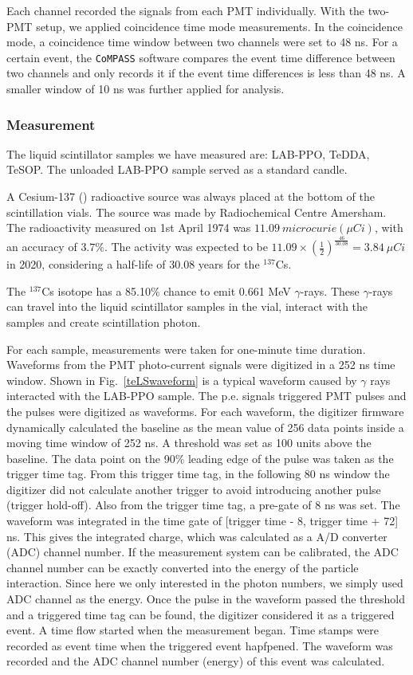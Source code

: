 Each channel recorded the signals from each PMT individually. With the two-PMT setup, we applied coincidence time mode measurements. In the coincidence mode, a coincidence time window between two channels were set to 48 ns. For a certain event, the \texttt{CoMPASS} software compares the event time difference between two channels and only records it if the event time differences is less than 48 ns. A smaller window of 10 ns was further applied for analysis.

\subsubsection{Measurement}

The liquid scintillator samples we have measured are: LAB-PPO, TeDDA, TeSOP. The unloaded LAB-PPO sample served as a standard candle. 

A Cesium-137 () radioactive source was always placed at the bottom of the scintillation vials.
The source was made by Radiochemical Centre Amersham. The radioactivity measured on 1st April 1974 was $11.09~microcurie(\mu Ci)$, with an accuracy of $3.7\%$. The activity was expected to be 
$11.09\times ({\frac{1}{2}})^{\frac{46}{30.08}}=3.84~\mu Ci$ in 2020, considering a half-life of 30.08 years for the $^{137}$Cs\cite{nndc}.

The $^{137}$Cs isotope has a 85.10\% chance to emit 0.661 MeV $\gamma$-rays\cite{nndc}. These $\gamma$-rays can travel into the liquid scintillator samples in the vial, interact with the samples and create scintillation photon.

For each sample, measurements were taken for one-minute time duration. Waveforms from the PMT photo-current signals were digitized in a 252 ns time window. Shown in Fig.~\ref{teLSwaveform} is a typical waveform caused by $\gamma$ rays interacted with the LAB-PPO sample. The p.e. signals triggered PMT pulses and the pulses were digitized as waveforms. For each waveform, the digitizer firmware dynamically calculated the baseline as the mean value of 256 data points inside a moving time window of 252 ns. A threshold was set as 100 units above the baseline. The data point on the 90\% leading edge of the pulse was taken as the trigger time tag. From this trigger time tag, in the following 80 ns window the digitizer did not calculate another trigger to avoid introducing another pulse (trigger hold-off). Also from the trigger time tag, a pre-gate of 8 ns was set. The waveform was integrated in the time gate of  [trigger time - 8,  trigger time + 72] ns. This gives the integrated charge, which was calculated as a A/D converter (ADC) channel number. If the measurement system can be calibrated, the ADC channel number can be exactly converted into the energy of the particle interaction. Since here we only interested in the photon numbers, we simply used ADC channel as the energy. Once the pulse in the waveform passed the threshold and a triggered time tag can be found, the digitizer considered it as a triggered event. A time flow started when the measurement began. Time stamps were recorded as event time when the triggered event hapfpened. The waveform was recorded and the ADC channel number (energy) of this event was calculated.


